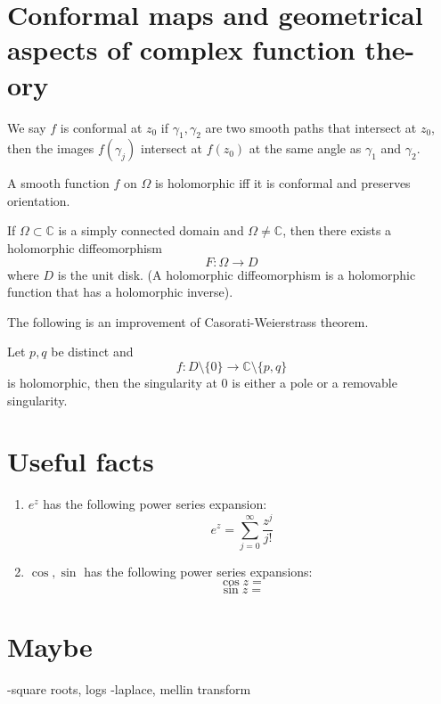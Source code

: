 \documentclass[openany]{book}
\newcommand{\C}{\mathbb{C}}
\begin{document}
\chapter{Conformal maps and geometrical aspects of complex function the-
ory}

\begin{defn}[conformal]
    We say $f$ is conformal at $z_0$ if $\gamma_1, \gamma_2$ are two smooth paths that intersect at $z_0$, then the images $f(\gamma_j)$ intersect at $f(z_0)$ at the same angle as $\gamma_1$ and $\gamma_2$.
\end{defn}


\begin{prop}
    A smooth function $f$ on $\Omega$ is holomorphic iff it is conformal and preserves orientation.
\end{prop}



\begin{thm}
    If $\Omega\subset\C$ is a simply connected domain and $\Omega\neq\C$, then there exists a holomorphic diffeomorphism
    \begin{equation*}
        F:\Omega\to D
    \end{equation*}
    where $D$ is the unit disk. (A holomorphic diffeomorphism is a holomorphic function that has a holomorphic inverse).
\end{thm}




The following is an improvement of Casorati-Weierstrass theorem.
\begin{thm}
    Let $p,q$ be distinct and 
    \begin{equation*}
        f:D\setminus\{0\}\to\C\setminus\{p,q\}
    \end{equation*}    
    is holomorphic, then the singularity at $0$ is either a pole or a removable singularity.
\end{thm}








\chapter{Useful facts}
\begin{enumerate}
    \item $e^z$ has the following power series expansion: 
    \begin{equation*}
        e^z=\sum_{j=0}^\infty\frac{z^j}{j!}
    \end{equation*}
    \item $\cos, \sin$ has the following power series expansions:
    \begin{equation*}
        \cos z=
    \end{equation*}
    \begin{equation*}
        \sin z=
    \end{equation*}
\end{enumerate}







\chapter{Maybe}
-square roots, logs
-laplace, mellin transform
\end{document}
